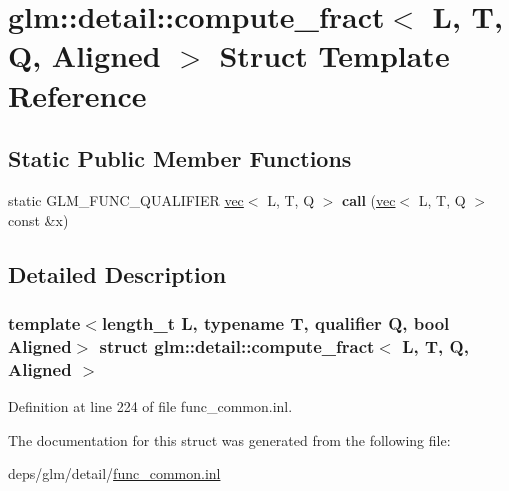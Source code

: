 \hypertarget{structglm_1_1detail_1_1compute__fract}{}\section{glm\+:\+:detail\+:\+:compute\+\_\+fract$<$ L, T, Q, Aligned $>$ Struct Template Reference}
\label{structglm_1_1detail_1_1compute__fract}
\subsection*{Static Public Member Functions}
\begin{DoxyCompactItemize}
\item 
\mbox{\label{structglm_1_1detail_1_1compute__fract_a45298051657b230289444a764cc573ad}} 
static G\+L\+M\+\_\+\+F\+U\+N\+C\+\_\+\+Q\+U\+A\+L\+I\+F\+I\+ER \hyperlink{structglm_1_1vec}{vec}$<$ L, T, Q $>$ {\bfseries call} (\hyperlink{structglm_1_1vec}{vec}$<$ L, T, Q $>$ const \&x)
\end{DoxyCompactItemize}


\subsection{Detailed Description}
\subsubsection*{template$<$length\+\_\+t L, typename T, qualifier Q, bool Aligned$>$\newline
struct glm\+::detail\+::compute\+\_\+fract$<$ L, T, Q, Aligned $>$}



Definition at line 224 of file func\+\_\+common.\+inl.



The documentation for this struct was generated from the following file\+:\begin{DoxyCompactItemize}
\item 
deps/glm/detail/\hyperlink{func__common_8inl}{func\+\_\+common.\+inl}\end{DoxyCompactItemize}

